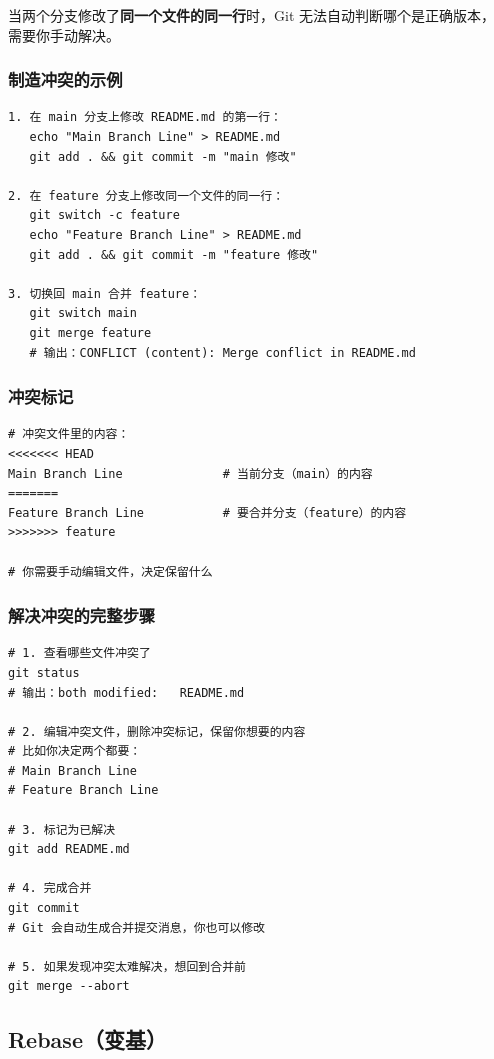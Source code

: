 \documentclass[12pt,a4paper]{article}
\begin{document}
当两个分支修改了\textbf{同一个文件的同一行}时，Git 无法自动判断哪个是正确版本，
需要你手动解决。

\subsubsection{制造冲突的示例}

\begin{lstlisting}[numbers=none]
1. 在 main 分支上修改 README.md 的第一行：
   echo "Main Branch Line" > README.md
   git add . && git commit -m "main 修改"

2. 在 feature 分支上修改同一个文件的同一行：
   git switch -c feature
   echo "Feature Branch Line" > README.md
   git add . && git commit -m "feature 修改"

3. 切换回 main 合并 feature：
   git switch main
   git merge feature
   # 输出：CONFLICT (content): Merge conflict in README.md
\end{lstlisting}

\subsubsection{冲突标记}

\begin{lstlisting}
# 冲突文件里的内容：
<<<<<<< HEAD
Main Branch Line              # 当前分支（main）的内容
=======
Feature Branch Line           # 要合并分支（feature）的内容
>>>>>>> feature

# 你需要手动编辑文件，决定保留什么
\end{lstlisting}

\subsubsection{解决冲突的完整步骤}

\begin{lstlisting}
# 1. 查看哪些文件冲突了
git status
# 输出：both modified:   README.md

# 2. 编辑冲突文件，删除冲突标记，保留你想要的内容
# 比如你决定两个都要：
# Main Branch Line
# Feature Branch Line

# 3. 标记为已解决
git add README.md

# 4. 完成合并
git commit
# Git 会自动生成合并提交消息，你也可以修改

# 5. 如果发现冲突太难解决，想回到合并前
git merge --abort
\end{lstlisting}

\subsection{Rebase（变基）}
\end{document}
